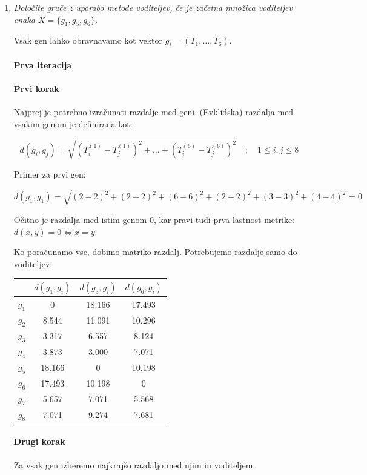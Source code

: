 \documentclass{article}
\begin{document}
\begin{enumerate}
	\item \textit{Določite gruče z uporabo metode voditeljev, če je začetna množica voditeljev
		enaka $X = \{g_1, g_5, g_6\}$.}

		Vsak gen lahko obravnavamo kot vektor $g_i = (T_1, \dots, T_6)$.

		\paragraph{Prva iteracija}
		\paragraph{Prvi korak} Najprej je potrebno izračunati razdalje med geni.
		(Evklidska) razdalja med vsakim genom je definirana kot:

		$$
		d(g_i, g_j) = \sqrt{ \left(T_{i}^{(1)} - T_{j}^{(1)} \right)^2 + \dots + \left(T_{i}^{(6)} - T_{j}^{(6)} \right)^2 } \quad ; \quad 1 \leq i,j \leq 8
		$$

		Primer za prvi gen:

		$$
		d(g_1, g_1) = \sqrt{ (2-2)^2 + (2-2)^2 + (6-6)^2 + (2-2)^2 + (3-3)^2 + (4-4)^2 } = 0
		$$

		Očitno je razdalja med istim genom 0, kar pravi tudi prva lastnost metrike: $d(x,y) = 0 \iff x = y$.

		Ko poračunamo vse, dobimo matriko razdalj. Potrebujemo razdalje samo do voditeljev:

		\begin{center}
			\begin{tabular}{c||c|c|c|}
				& $d(g_1, g_i)$ & $d(g_5, g_i)$ & $d(g_6, g_i)$ \\
				\hline
				\hline
				$g_1$ & 0 & 18.166 & 17.493\\
				\hline
				$g_2$ & 8.544 & 11.091 & 10.296\\
				\hline
				$g_3$ & 3.317 & 6.557 & 8.124\\
				\hline
				$g_4$ & 3.873 & 3.000 & 7.071\\
				\hline
				$g_5$ & 18.166 & 0 & 10.198\\
				\hline
				$g_6$ & 17.493 & 10.198 & 0\\
				\hline
				$g_7$ & 5.657 & 7.071 & 5.568\\
				\hline
				$g_8$ & 7.071 & 9.274 & 7.681\\
			\end{tabular}
		\end{center}

		\paragraph{Drugi korak} Za vsak gen izberemo najkrajšo razdaljo med njim in voditeljem.


\end{enumerate}
\end{document}

